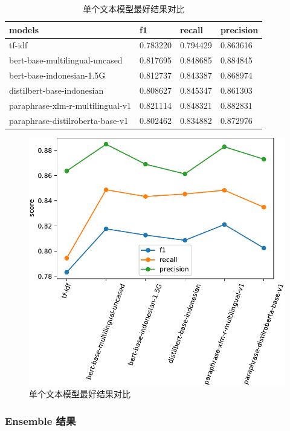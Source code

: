 \documentclass[12pt]{article}
\begin{document}
\begin{table}[htbp]
  \centering
  \caption{单个文本模型最好结果对比}
  \label{tab:text_best_results}
  \begin{tabular}{llll}
    \toprule
    models           & f1       & recall   & precision \\
    \midrule
    tf-idf                           & 0.783220 & 0.794429 & 0.863616  \\
    bert-base-multilingual-uncased   & 0.817695 & 0.848685 & 0.884845  \\
    bert-base-indonesian-1.5G        & 0.812737 & 0.843387 & 0.868974  \\
    distilbert-base-indonesian       & 0.808627 & 0.845347 & 0.861303  \\
    paraphrase-xlm-r-multilingual-v1 & 0.821114 & 0.848321 & 0.882831  \\
    paraphrase-distilroberta-base-v1 & 0.802462 & 0.834882 & 0.872976 \\
    \bottomrule
  \end{tabular}
\end{table}

\begin{figure}[htbp]
  \centering
  \includegraphics[width=12cm]{best_text_results_df.pdf}
  \caption{单个文本模型最好结果对比}
  \label{fig:best_text_results_df}
\end{figure}

\subsubsection{Ensemble 结果}
\end{document}
